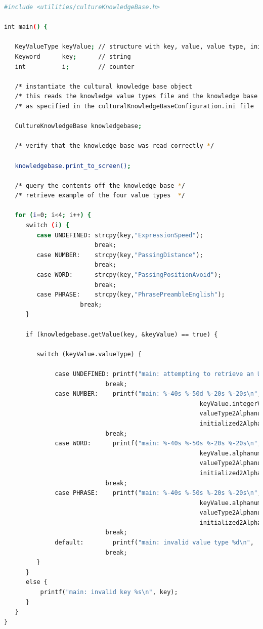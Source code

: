 \documentclass{CSSRforAfrica}
\begin{document}
\begin{lstlisting}[style=withoutNumbering, language=bash]
#include <utilities/cultureKnowledgeBase.h>

int main() {

   KeyValueType keyValue; // structure with key, value, value type, initialization flag
   Keyword      key;      // string
   int          i;        // counter
   
   /* instantiate the cultural knowledge base object                         */
   /* this reads the knowledge value types file and the knowledge base file  */
   /* as specified in the culturalKnowledgeBaseConfiguration.ini file        */
  
   CultureKnowledgeBase knowledgebase;  

   /* verify that the knowledge base was read correctly */
   
   knowledgebase.print_to_screen();
  
   /* query the contents off the knowledge base */
   /* retrieve example of the four value types  */

   for (i=0; i<4; i++) {
      switch (i) {
         case UNDEFINED: strcpy(key,"ExpressionSpeed");    
                         break;
         case NUMBER:    strcpy(key,"PassingDistance");         
                         break;
         case WORD:      strcpy(key,"PassingPositionAvoid");    
                         break;	
         case PHRASE:    strcpy(key,"PhrasePreambleEnglish"); 
 	                 break;
      }
     
      if (knowledgebase.getValue(key, &keyValue) == true) {
      
         switch (keyValue.valueType) {

	          case UNDEFINED: printf("main: attempting to retrieve an UNDEFINED value type\n");
                            break;
	          case NUMBER:    printf("main: %-40s %-50d %-20s %-20s\n", keyValue.key,
				                                      keyValue.integerValue,
				                                      valueType2Alphanumeric(keyValue.valueType),
				                                      initialized2Alphanumeric(keyValue.initialized));
                            break;
	          case WORD:      printf("main: %-40s %-50s %-20s %-20s\n", keyValue.key,
				                                      keyValue.alphanumericValue,
				                                      valueType2Alphanumeric(keyValue.valueType), 
				                                      initialized2Alphanumeric(keyValue.initialized));
                            break;
	          case PHRASE:    printf("main: %-40s %-50s %-20s %-20s\n", keyValue.key,
				                                      keyValue.alphanumericValue,
				                                      valueType2Alphanumeric(keyValue.valueType),
				                                      initialized2Alphanumeric(keyValue.initialized));
                            break;	    
	          default:        printf("main: invalid value type %d\n",   keyValue.valueType);
                            break;
         }
      }
      else {
          printf("main: invalid key %s\n", key);
      }
   }
}
\end{lstlisting}
\end{document}
